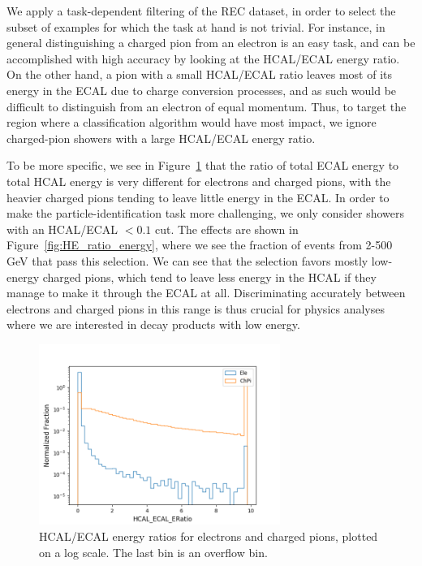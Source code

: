 We apply a task-dependent filtering of the REC dataset, in order to select the subset of examples for which the task at hand is not trivial. For instance, in general distinguishing a charged pion from an electron is an easy task, and can be accomplished with high accuracy by looking at the HCAL/ECAL energy ratio. On the other hand, a pion with a small HCAL/ECAL ratio leaves most of its energy in the ECAL due to charge conversion processes, and as such would be difficult to distinguish from an electron of equal momentum. Thus, to target the region where a classification algorithm would have most impact, we ignore charged-pion showers with a large HCAL/ECAL energy ratio.

To be more specific, we see in Figure~\ref{fig:HE_ratio} that the ratio of total ECAL energy to total HCAL energy is very different for electrons and charged pions, with the heavier charged pions tending to leave little energy in the ECAL. In order to make the particle-identification task more challenging, we only consider showers with an HCAL/ECAL $< 0.1$ cut. The effects are shown in Figure~\ref{fig:HE_ratio_energy}, where we see the fraction of events from 2-500 GeV that pass this selection. We can see that the selection favors mostly low-energy charged pions, which tend to leave less energy in the HCAL if they manage to make it through the ECAL at all. Discriminating accurately between electrons and charged pions in this range is thus crucial for physics analyses where we are interested in decay products with low energy.

\begin{figure}[htbp]
    \centering
    \includegraphics[width=0.7\textwidth]{Images/Calo/ratios.png}
    \caption{HCAL/ECAL energy ratios for electrons and charged pions, plotted on a log scale. The last bin is an overflow bin.}
    \label{fig:HE_ratio}
\end{figure}

